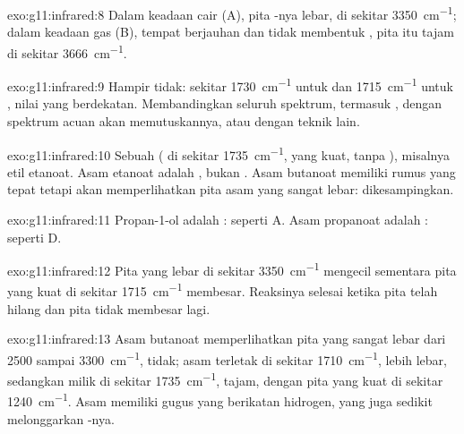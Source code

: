 \begin{solution}{exo:g11:infrared:8}
Dalam keadaan cair (A), pita -nya lebar, di sekitar
\qty{3350}{cm^{-1}}; dalam keadaan gas (B), tempat 
berjauhan dan tidak membentuk , pita itu tajam di sekitar
\qty{3666}{cm^{-1}}.
\end{solution}

\begin{solution}{exo:g11:infrared:9}
Hampir tidak: sekitar \qty{1730}{cm^{-1}} untuk  dan
\qty{1715}{cm^{-1}} untuk , nilai yang berdekatan. Membandingkan
seluruh spektrum, termasuk , dengan spektrum acuan
akan memutuskannya, atau dengan teknik lain.
\end{solution}

\begin{solution}{exo:g11:infrared:10}
Sebuah  ( di sekitar \qty{1735}{cm^{-1}},  yang
kuat, tanpa ), misalnya etil etanoat. Asam etanoat adalah
, bukan . Asam butanoat memiliki rumus yang tepat
tetapi akan memperlihatkan pita  asam yang sangat lebar:
dikesampingkan.
\end{solution}

\begin{solution}{exo:g11:infrared:11}
Propan-1-ol adalah : seperti A. Asam propanoat adalah : seperti D.
\end{solution}

\begin{solution}{exo:g11:infrared:12}
Pita  yang lebar di sekitar \qty{3350}{cm^{-1}} mengecil
sementara pita  yang kuat di sekitar \qty{1715}{cm^{-1}}
membesar. Reaksinya selesai ketika pita  telah hilang dan pita
 tidak membesar lagi.
\end{solution}

\begin{solution}{exo:g11:infrared:13}
Asam butanoat memperlihatkan pita  yang sangat lebar dari 2500
sampai \qty{3300}{cm^{-1}},  tidak;  asam terletak di
sekitar \qty{1710}{cm^{-1}}, lebih lebar, sedangkan milik  di sekitar
\qty{1735}{cm^{-1}}, tajam, dengan pita  yang kuat di sekitar
\qty{1240}{cm^{-1}}. Asam memiliki gugus  yang berikatan
hidrogen, yang juga sedikit melonggarkan -nya.
\end{solution}

